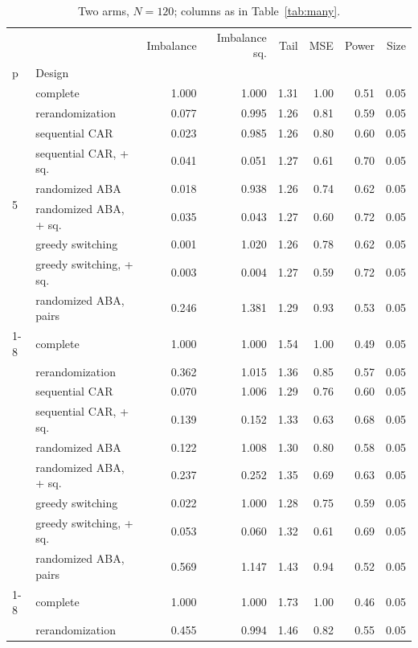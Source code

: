 \begin{table}[t]
\centering
\caption{Two arms, $N = 120$; columns as in Table~\ref{tab:many}.}
\label{tab:two}
\begin{tabular}{llrrrrrr}
\toprule
 &  & Imbalance & Imbalance sq. & Tail & MSE & Power & Size \\
p & Design &  &  &  &  &  &  \\
\midrule
\multirow[t]{9}{*}{5} & complete & 1.000 & 1.000 & 1.31 & 1.00 & 0.51 & 0.05 \\
 & rerandomization & 0.077 & 0.995 & 1.26 & 0.81 & 0.59 & 0.05 \\
 & sequential CAR & 0.023 & 0.985 & 1.26 & 0.80 & 0.60 & 0.05 \\
 & sequential CAR, + sq. & 0.041 & 0.051 & 1.27 & 0.61 & 0.70 & 0.05 \\
 & randomized ABA & 0.018 & 0.938 & 1.26 & 0.74 & 0.62 & 0.05 \\
 & randomized ABA, + sq. & 0.035 & 0.043 & 1.27 & 0.60 & 0.72 & 0.05 \\
 & greedy switching & 0.001 & 1.020 & 1.26 & 0.78 & 0.62 & 0.05 \\
 & greedy switching, + sq. & 0.003 & 0.004 & 1.27 & 0.59 & 0.72 & 0.05 \\
 & randomized ABA, pairs & 0.246 & 1.381 & 1.29 & 0.93 & 0.53 & 0.05 \\
\cline{1-8}
\multirow[t]{9}{*}{20} & complete & 1.000 & 1.000 & 1.54 & 1.00 & 0.49 & 0.05 \\
 & rerandomization & 0.362 & 1.015 & 1.36 & 0.85 & 0.57 & 0.05 \\
 & sequential CAR & 0.070 & 1.006 & 1.29 & 0.76 & 0.60 & 0.05 \\
 & sequential CAR, + sq. & 0.139 & 0.152 & 1.33 & 0.63 & 0.68 & 0.05 \\
 & randomized ABA & 0.122 & 1.008 & 1.30 & 0.80 & 0.58 & 0.05 \\
 & randomized ABA, + sq. & 0.237 & 0.252 & 1.35 & 0.69 & 0.63 & 0.05 \\
 & greedy switching & 0.022 & 1.000 & 1.28 & 0.75 & 0.59 & 0.05 \\
 & greedy switching, + sq. & 0.053 & 0.060 & 1.32 & 0.61 & 0.69 & 0.05 \\
 & randomized ABA, pairs & 0.569 & 1.147 & 1.43 & 0.94 & 0.52 & 0.05 \\
\cline{1-8}
\multirow[t]{9}{*}{30} & complete & 1.000 & 1.000 & 1.73 & 1.00 & 0.46 & 0.05 \\
 & rerandomization & 0.455 & 0.994 & 1.46 & 0.82 & 0.55 & 0.05 \\

\end{tabular}
\end{table}
